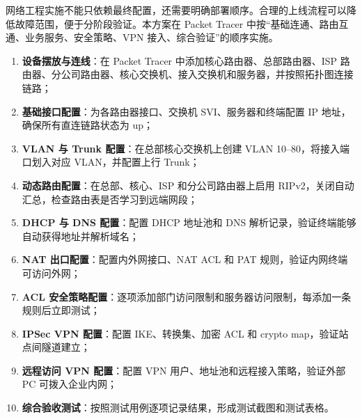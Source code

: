 \documentclass[12pt,a4paper]{ctexart}
\begin{document}
网络工程实施不能只依赖最终配置，还需要明确部署顺序。合理的上线流程可以降低故障范围，便于分阶段验证。本方案在 Packet Tracer 中按“基础连通、路由互通、业务服务、安全策略、VPN 接入、综合验证”的顺序实施。

\begin{enumerate}[label=(\arabic*), leftmargin=2em]
    \item \textbf{设备摆放与连线}：在 Packet Tracer 中添加核心路由器、总部路由器、ISP 路由器、分公司路由器、核心交换机、接入交换机和服务器，并按照拓扑图连接链路；
    \item \textbf{基础接口配置}：为各路由器接口、交换机 SVI、服务器和终端配置 IP 地址，确保所有直连链路状态为 up；
    \item \textbf{VLAN 与 Trunk 配置}：在总部核心交换机上创建 VLAN 10--80，将接入端口划入对应 VLAN，并配置上行 Trunk；
    \item \textbf{动态路由配置}：在总部、核心、ISP 和分公司路由器上启用 RIPv2，关闭自动汇总，检查路由表是否学习到远端网段；
    \item \textbf{DHCP 与 DNS 配置}：配置 DHCP 地址池和 DNS 解析记录，验证终端能够自动获得地址并解析域名；
    \item \textbf{NAT 出口配置}：配置内外网接口、NAT ACL 和 PAT 规则，验证内网终端可访问外网；
    \item \textbf{ACL 安全策略配置}：逐项添加部门访问限制和服务器访问限制，每添加一条规则后立即测试；
    \item \textbf{IPSec VPN 配置}：配置 IKE、转换集、加密 ACL 和 crypto map，验证站点间隧道建立；
    \item \textbf{远程访问 VPN 配置}：配置 VPN 用户、地址池和远程接入策略，验证外部 PC 可拨入企业内网；
    \item \textbf{综合验收测试}：按照测试用例逐项记录结果，形成测试截图和测试表格。
\end{enumerate}
\end{document}
